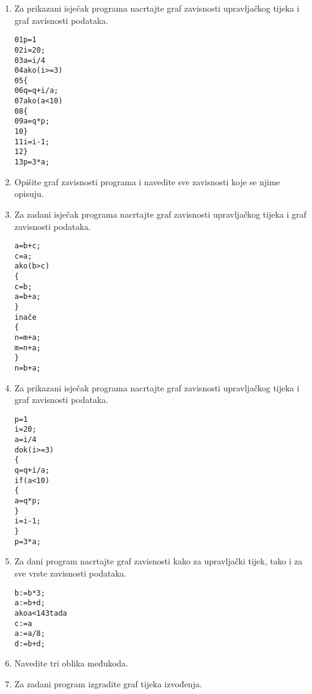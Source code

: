 \documentclass[times, 12pt, utf8]{book}
\begin{document}
\begin{enumerate}[resume]
\item
Za prikazani isječak programa nacrtajte graf zavisnosti upravljačkog tijeka i graf zavisnosti podataka. \cite[str.~257-259]{udzbenik} \cite{auditorne}

\begin{alltt}
01  p = 1
02  i = 20;
03  a = i / 4
04  ako(i >= 3)
05  \verb|{|
06    q = q + i/a;
07    ako(a<10)
08    \verb|{|
09      a = q*p;
10    \verb|}|
11    i = i-1;
12  \verb|}|
13  p = 3 * a;
\end{alltt} 

\item
Opišite graf zavisnosti programa i navedite sve zavisnosti koje se njime opisuju. \cite[str.~257-259]{udzbenik}

\item
Za zadani isječak programa nacrtajte graf zavisnosti upravljačkog tijeka i graf zavisnosti podataka. \cite[str.~257-259]{udzbenik} \cite{auditorne}

\begin{alltt}
a=b+c;
c=a;
ako (b>c)
\verb|{|
  c=b;
  a=b+a;
\verb|}|
inače
\verb|{|
  n=m+a;
  m=n+a;
\verb|}|
n=b+a;
\end{alltt} 

\item
Za prikazani isječak programa nacrtajte graf zavisnosti upravljačkog tijeka i graf zavisnosti podataka. \cite[str.~257-259]{udzbenik} \cite{auditorne}

\begin{alltt}
p = 1
i = 20;
a = i / 4
dok(i >= 3)
\verb|{|
  q = q + i/a;
  if(a<10)
  \verb|{|
    a = q*p;
  \verb|}|
  i = i-1;
\verb|}|
p = 3 * a;
\end{alltt} 

\item 
Za dani program nacrtajte graf zavisnosti kako za upravljački tijek, tako i za sve vrste zavisnosti podataka.\cite[str.~257-259]{udzbenik} \cite{auditorne}

\noindent
\begin{alltt}
b:=b*3;
a:=b+d;
ako a<143 tada
  c:=a%8;
  a:=a/8;
d:=b+d;
\end{alltt} 

\item
Navedite tri oblika međukoda. \cite[str.~255]{udzbenik}

\item
Za zadani program izgradite graf tijeka izvođenja. \cite[str.~257-259]{udzbenik} \cite{auditorne}


\end{enumerate}
\end{document}
